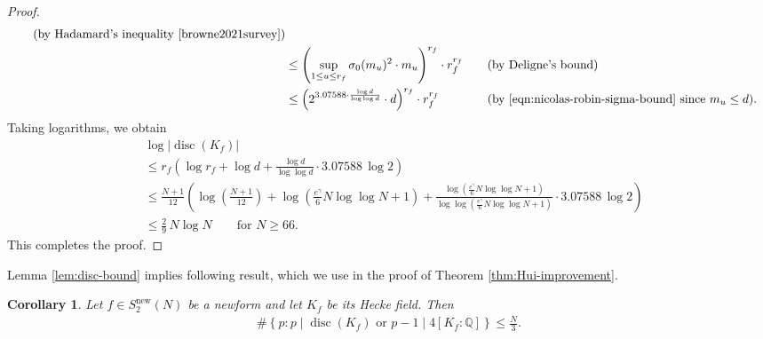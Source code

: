 \documentclass[11pt,letterpaper,reqno]{amsart}
\newtheorem{corollary}[theorem]{Corollary}
\theoremstyle{definition}
\numberwithin{equation}{section}
\numberwithin{figure}{section}
\numberwithin{table}{section}
\newcommand{\nw}{\mathrm{new}}
\begin{document}
\begin{proof}
\begin{align}
    \qquad \text{(by Hadamard's inequality \cite[Theorem 1]{browne2021survey})} \\
    &\leq \left( \sup_{1\le u \le r_f} \sigma_0(m_u)^2 \cdot m_u  \right)^{r_f} \cdot r_f^{r_f} \qquad \text{(by Deligne's bound)} \\
    &\leq \left( 2^{3.07588 \cdot \frac{\log d}{\log \log d}} \cdot d  \right)^{r_f} \cdot r_f^{r_f} \qquad\qquad \text{(by \eqref{eqn:nicolas-robin-sigma-bound} since $m_u \le d$)}.
\end{align}
Taking logarithms, we obtain
\begin{align}
    &\log \left| \operatorname{disc}(K_f) \right| \\
    &\leq r_f \left( \log r_f + \log d + \frac{\log d}{\log \log d} \cdot 3.07588 \, \log 2 \right)\\
    &\leq  \frac{N + 1}{12} \!\left( \log \left( \frac{N + 1}{12} \right) + \log \left( \frac{e^\gamma}{6} N \log \log N + 1 \right) + \frac{\log \left( \frac{e^\gamma}{6} N \log \log N + 1 \right)}{\log \log \left( \frac{e^\gamma}{6} N \log \log N + 1 \right)} \cdot 3.07588 \, \log 2 \right)\\
    &\leq \frac{2}{9} \,  N   \log N    \qquad \text{for $N \geq 66$}.
\end{align}
This completes the proof.
\end{proof}

Lemma \ref{lem:disc-bound} implies following result, which we use in the proof of Theorem \ref{thm:Hui-improvement}.

\begin{corollary}\label{cor:omega-log-disc}
    Let $f \in S_2^\nw(N)$ be a newform and let $K_f$ be its Hecke field. Then
    \begin{align}
        \#\left\{ p : p \mid \operatorname{disc}(K_f) \text{ or } p - 1 \mid 4[K_f : \mathbb{Q} ] \right\} \leq \frac{N}{3}.
    \end{align}
\end{corollary}
\end{document}
